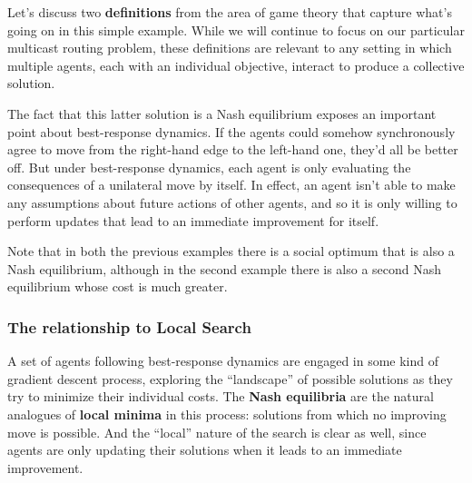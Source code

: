 Let’s discuss two \textbf{definitions} from the area of game theory that capture what’s going on in this simple example. While we will continue to focus on our particular multicast routing problem, these definitions are relevant to any setting in which multiple agents, each with an individual objective, interact to produce a collective solution.




The fact that this latter solution is a Nash equilibrium exposes an important point about best-response dynamics. If the agents could somehow synchronously agree to move from the right-hand edge to the left-hand one, they’d all be better off. But under best-response dynamics, each agent is only evaluating the consequences of a unilateral move by itself. In effect, an agent isn’t able to make any assumptions about future actions of other agents, and so it is only willing to perform updates that lead to an immediate improvement for itself.


Note that in both the previous examples there is a social optimum that is also a Nash equilibrium, although in the second example there is also a second Nash equilibrium whose cost is much greater.

\subsubsection{The relationship to Local Search}
A set of agents following best-response dynamics are engaged in some kind of gradient descent process, exploring the “landscape” of possible solutions as they try to minimize their individual costs. The \textbf{Nash equilibria} are the natural analogues of \textbf{local minima} in this process: solutions from which no improving move is possible. And the “local” nature of the search is clear as well, since agents are only updating their solutions when it leads to an immediate improvement.

